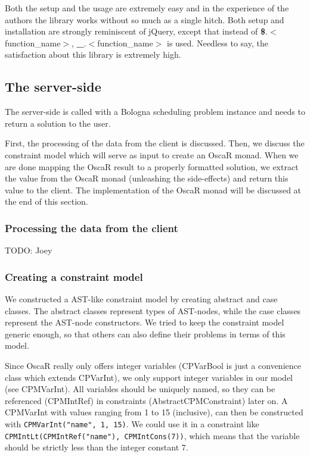 \documentclass[a4paper]{article}
\begin{document}
Both the setup and the usage are extremely easy and in the experience
of the authors the library works without so much as a single
hitch. Both setup and installation are strongly reminiscent of jQuery,
except that instead of \textbf{\$}.$<$function\_name$>$,
\textbf{\_}.$<$function\_name$>$ is used. Needless to say, the
satisfaction about this library is extremely high.\\

\subsection{The server-side}
The server-side is called with a Bologna scheduling problem instance
and needs to return a solution to the user.

First, the processing of the data from the client is discussed.
Then, we discuss the constraint model which will serve as input to create
an OscaR monad.
When we are done mapping the OscaR result to a properly formatted solution,
we extract the value from the OscaR monad (unleashing the side-effects)
and return this value to the client.
The implementation of the OscaR monad will be discussed at the end of this section.
\subsubsection{Processing the data from the client}
\label{sec:ProcessingClientData}
{\Large TODO:} Joey



\subsubsection{Creating a constraint model}
We constructed a AST-like constraint model by creating 
abstract and case classes. 
The abstract classes represent types of AST-nodes, 
while the case classes represent the AST-node constructors.
We tried to keep the constraint model generic enough,
so that others can also define their problems in terms of this model.

Since OscaR really only offers integer variables 
(CPVarBool is just a convenience class which extends CPVarInt),
we only support integer variables in our model (see CPMVarInt).
All variables should be uniquely named, 
so they can be referenced (CPMIntRef) in constraints (AbstractCPMConstraint) later on.
A CPMVarInt with values ranging from 1 to 15 (inclusive), 
can then be constructed with \verb|CPMVarInt("name", 1, 15)|.
We could use it in a constraint like 
\verb|CPMIntLt(CPMIntRef("name"), CPMIntCons(7))|,
which means that the variable should be strictly less than the integer constant 7.
\end{document}
